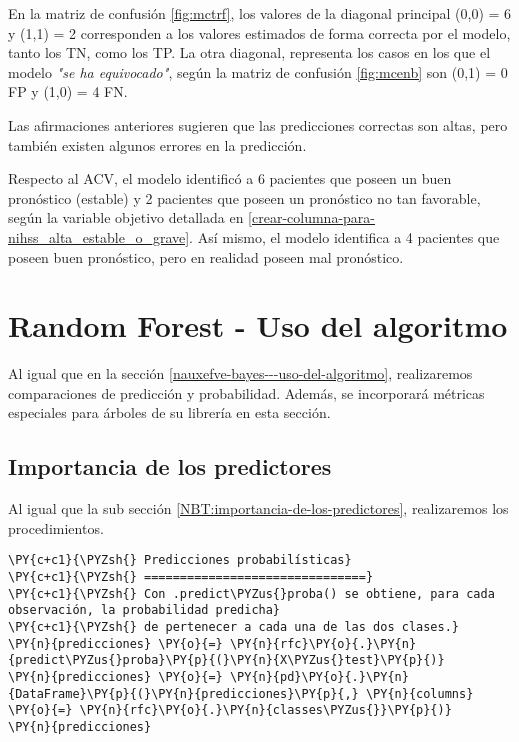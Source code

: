    	En la matriz de confusión \ref{fig:mctrf}, los valores de la diagonal principal (0,0) = 6 y (1,1) = 2 corresponden a los valores estimados de forma correcta por el modelo, tanto los TN, como los TP. La otra diagonal, representa los casos en los que el modelo \textit{"se ha equivocado"}, según la matriz de confusión \ref{fig:mcenb} son (0,1) = 0 FP y (1,0) = 4 FN.
\par Las afirmaciones anteriores sugieren que las predicciones correctas son altas, pero también existen algunos errores en la predicción.
\par Respecto al ACV, el modelo identificó a 6 pacientes que poseen un buen pronóstico (estable) y 2 pacientes que poseen un pronóstico no tan favorable, según la variable objetivo detallada en \ref{crear-columna-para-nihss_alta_estable_o_grave}. Así mismo, el modelo identifica a 4 pacientes que poseen buen pronóstico, pero en realidad poseen mal pronóstico.\\

    \hypertarget{random-forest---uso-del-algoritmo}{%
\section{Random Forest - Uso del algoritmo}\label{random-forest---uso-del-algoritmo}}
	
	Al igual que en la sección \ref{nauxefve-bayes---uso-del-algoritmo}, realizaremos comparaciones de predicción y probabilidad. Además, se incorporará métricas especiales para árboles de su librería en esta sección.

    \hypertarget{importancia-de-los-predictores}{%
\subsection{Importancia de los predictores}\label{importancia-de-los-predictores}}

	 Al igual que la sub sección \ref{NBT:importancia-de-los-predictores}, realizaremos los procedimientos.\\

    \begin{tcolorbox}[breakable, size=fbox, boxrule=1pt, pad at break*=1mm,colback=cellbackground, colframe=cellborder]
\begin{Verbatim}[commandchars=\\\{\}]
\PY{c+c1}{\PYZsh{} Predicciones probabilísticas}
\PY{c+c1}{\PYZsh{} ===============================}
\PY{c+c1}{\PYZsh{} Con .predict\PYZus{}proba() se obtiene, para cada observación, la probabilidad predicha}
\PY{c+c1}{\PYZsh{} de pertenecer a cada una de las dos clases.}
\PY{n}{predicciones} \PY{o}{=} \PY{n}{rfc}\PY{o}{.}\PY{n}{predict\PYZus{}proba}\PY{p}{(}\PY{n}{X\PYZus{}test}\PY{p}{)}
\PY{n}{predicciones} \PY{o}{=} \PY{n}{pd}\PY{o}{.}\PY{n}{DataFrame}\PY{p}{(}\PY{n}{predicciones}\PY{p}{,} \PY{n}{columns} \PY{o}{=} \PY{n}{rfc}\PY{o}{.}\PY{n}{classes\PYZus{}}\PY{p}{)}
\PY{n}{predicciones}
\end{Verbatim}
\end{tcolorbox}

